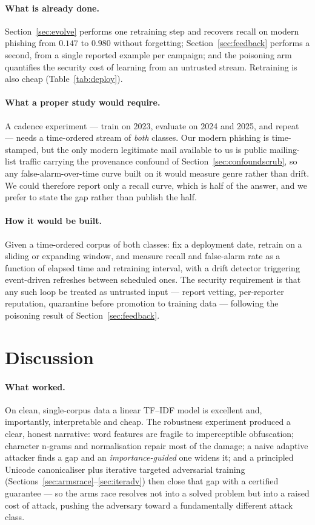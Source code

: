 \documentclass[11pt]{article}
\begin{document}
\paragraph{What is already done.} Section~\ref{sec:evolve} performs one retraining step and recovers
recall on modern phishing from $0.147$ to $0.980$ without forgetting;
Section~\ref{sec:feedback} performs a second, from a single reported example per campaign; and the
poisoning arm quantifies the security cost of learning from an untrusted stream. Retraining is also
cheap (Table~\ref{tab:deploy}).

\paragraph{What a proper study would require.} A cadence experiment --- train on 2023, evaluate on
2024 and 2025, and repeat --- needs a time-ordered stream of \emph{both} classes. Our modern phishing
is time-stamped, but the only modern legitimate mail available to us is public mailing-list traffic
carrying the provenance confound of Section~\ref{sec:confoundscrub}, so any false-alarm-over-time
curve built on it would measure genre rather than drift. We could therefore report only a recall
curve, which is half of the answer, and we prefer to state the gap rather than publish the half.

\paragraph{How it would be built.} Given a time-ordered corpus of both classes: fix a deployment date,
retrain on a sliding or expanding window, and measure recall and false-alarm rate as a function of
elapsed time and retraining interval, with a drift detector triggering event-driven refreshes between
scheduled ones. The security requirement is that any such loop be treated as untrusted input ---
report vetting, per-reporter reputation, quarantine before promotion to training data --- following
the poisoning result of Section~\ref{sec:feedback}.

\section{Discussion}

\paragraph{What worked.} On clean, single-corpus data a linear TF--IDF model is
excellent and, importantly, interpretable and cheap. The robustness experiment
produced a clear, honest narrative: word features are fragile to imperceptible
obfuscation; character n-grams and normalisation repair most of the damage; a naive
adaptive attacker finds a gap and an \emph{importance-guided} one widens it; and a
principled Unicode canonicaliser plus iterative targeted adversarial training
(Sections~\ref{sec:armsrace}--\ref{sec:iteradv}) then close that gap with a certified
guarantee --- so the arms race resolves not into a solved problem but into a raised cost of
attack, pushing the adversary toward a fundamentally different attack class.
\end{document}
